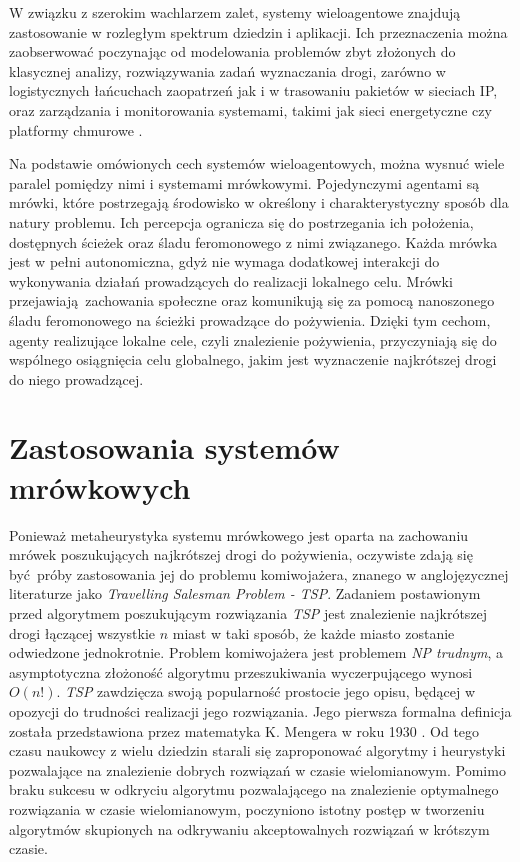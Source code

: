 {{        %
        W związku z szerokim wachlarzem zalet, systemy wieloagentowe znajdują zastosowanie w rozległym spektrum dziedzin
        i aplikacji. Ich przeznaczenia można zaobserwować poczynając od modelowania problemów zbyt złożonych do
        klasycznej analizy, rozwiązywania zadań wyznaczania drogi, zarówno w logistycznych łańcuchach zaopatrzeń jak i
        w trasowaniu pakietów w sieciach IP, oraz zarządzania i monitorowania systemami, takimi jak sieci energetyczne
        czy platformy chmurowe \cite{Dorri2018MultiAgentSA, Oprea2004ApplicationsOM}.

        Na podstawie omówionych cech systemów wieloagentowych, można wysnuć wiele paralel pomiędzy nimi i systemami
        mrówkowymi. Pojedynczymi agentami są mrówki, które postrzegają środowisko w określony i charakterystyczny sposób
        dla natury problemu. Ich percepcja ogranicza się do postrzegania ich położenia, dostępnych ścieżek oraz śladu
        feromonowego z nimi związanego. Każda mrówka jest w pełni autonomiczna, gdyż nie wymaga dodatkowej interakcji do
        wykonywania działań prowadzących do realizacji lokalnego celu. Mrówki przejawiają zachowania społeczne oraz
        komunikują się za pomocą nanoszonego śladu feromonowego na ścieżki prowadzące do pożywienia. Dzięki tym cechom,
        agenty realizujące lokalne cele, czyli znalezienie pożywienia, przyczyniają się do wspólnego osiągnięcia celu
        globalnego, jakim jest wyznaczenie najkrótszej drogi do niego prowadzącej.
    }

    \section{Zastosowania systemów mrówkowych}
    {
        Ponieważ metaheurystyka systemu mrówkowego jest oparta na zachowaniu mrówek poszukujących najkrótszej drogi do
        pożywienia, oczywiste zdają się być próby zastosowania jej do problemu komiwojażera, znanego w anglojęzycznej
        literaturze jako \textit{Travelling Salesman Problem - TSP}. Zadaniem postawionym przed algorytmem poszukującym
        rozwiązania \textit{TSP} jest znalezienie najkrótszej drogi łączącej wszystkie $n$ miast w taki sposób, że każde
        miasto zostanie odwiedzone jednokrotnie. Problem komiwojażera jest problemem \textit{NP trudnym}, a
        asymptotyczna złożoność algorytmu przeszukiwania wyczerpującego wynosi $O(n!)$. \textit{TSP} zawdzięcza swoją
        popularność prostocie jego opisu, będącej w opozycji do trudności realizacji jego rozwiązania. Jego pierwsza
        formalna definicja została przedstawiona przez matematyka K. Mengera w roku
        1930 \cite{Mazidi2017MetaHeuristicAF}. Od tego czasu naukowcy z wielu dziedzin starali się zaproponować algorytmy
        i heurystyki pozwalające na znalezienie dobrych rozwiązań w czasie wielomianowym. Pomimo braku sukcesu w
        odkryciu algorytmu pozwalającego na znalezienie optymalnego rozwiązania w czasie wielomianowym, poczyniono
        istotny postęp w tworzeniu algorytmów skupionych na odkrywaniu akceptowalnych rozwiązań w krótszym czasie.

}}
